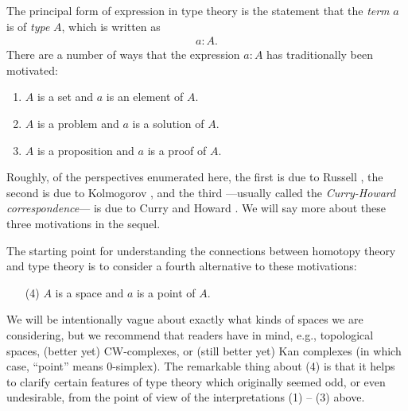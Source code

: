 \documentclass[11pt]{amsart}
\theoremstyle{definition}
\theoremstyle{remark}
\numberwithin{equation}{section}
\begin{document}
The principal form of expression in type theory is the statement that
the \emph{term} $a$ is of
\emph{type} $A$, which is written as 
\begin{align*}
  a:A.
\end{align*}
There are a number of ways that the expression $a:A$ has traditionally
been motivated:
\begin{enumerate}
\item $A$ is a set and $a$ is an element of $A$.
\item $A$ is a problem and $a$ is a solution of $A$.
\item $A$ is a proposition and $a$ is a proof of $A$.
\end{enumerate}
Roughly, of the perspectives enumerated here,
the first is due to Russell \cite{Russell:1903wn}, the
second is due to Kolmogorov \cite{Kolmogoroff:1932wl}, and the third
---usually called the \emph{Curry-Howard correspondence}---
is due to Curry and Howard \cite{Howard:FTNC}.  We will say more about
these three motivations in the sequel.

The starting point for understanding the connections between homotopy
theory and type theory is to consider a fourth alternative to these
motivations:
\begin{enumerate}
\item[(4)] $A$ is a space and $a$ is a point of $A$.
\end{enumerate}
We will be intentionally vague about exactly what kinds of
spaces we are considering, but we recommend that readers have in mind,
e.g., topological spaces, (better yet) CW-complexes, or (still better yet)
Kan complexes (in which case, ``point'' means $0$-simplex).  The
remarkable thing about (4) is that it helps to clarify certain features of
type theory which originally seemed odd, or
even undesirable, from the point of view of the
interpretations (1) -- (3) above.  
\end{document}
